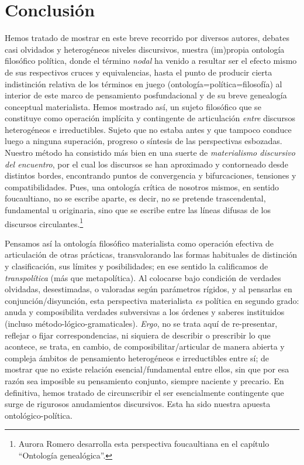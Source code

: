 \section{Conclusión} %

Hemos tratado de mostrar en este breve recorrido por diversos autores, debates casi olvidados y heterogéneos niveles discursivos, nuestra (im)propia ontología filosófico política, donde el término \emph{nodal} ha venido a resultar ser el efecto mismo de sus respectivos cruces y equivalencias, hasta el punto de producir cierta indistinción relativa de los términos en juego (ontología=política=filosofía) al interior de este marco de pensamiento posfundacional y de su breve genealogía conceptual materialista. Hemos mostrado así, un sujeto filosófico que se constituye como operación implícita y contingente de articulación \emph{entre} discursos heterogéneos e irreductibles. Sujeto que no estaba antes y que tampoco conduce luego a ninguna superación, progreso o síntesis de las perspectivas esbozadas. Nuestro método ha consistido más bien en una suerte de \emph{materialismo discursivo del encuentro}, por el cual los discursos se han aproximado y contorneado desde distintos bordes, encontrando puntos de convergencia y bifurcaciones, tensiones y compatibilidades. Pues, una ontología crítica de nosotros mismos, en sentido foucaultiano, no se escribe aparte, es decir, no se pretende trascendental, fundamental u originaria, sino que se escribe entre las líneas difusas de los discursos circulantes.\footnote{Aurora Romero desarrolla esta perspectiva foucaultiana en el capítulo \enquote{Ontología genealógica}.}

Pensamos así la ontología filosófico materialista como operación efectiva de articulación de otras prácticas, transvalorando las formas habituales de distinción y clasificación, sus límites y posibilidades; en ese sentido la calificamos de \emph{transpolítica} (más que metapolítica). Al colocarse bajo condición de verdades olvidadas, desestimadas, o valoradas según parámetros rígidos, y al pensarlas en conjunción/disyunción, esta perspectiva materialista \emph{es} política en segundo grado: anuda y composibilita verdades subversivas a los órdenes y saberes instituidos (incluso método-lógico-gramaticales). \emph{Ergo}, no se trata aquí de re-presentar, reflejar o fijar correspondencias, ni siquiera de describir o prescribir lo que acontece, se trata, en cambio, de composibilitar/articular de manera abierta y compleja ámbitos de pensamiento heterogéneos e irreductibles entre sí; de mostrar que no existe relación esencial/fundamental entre ellos, sin que por esa razón sea imposible su pensamiento conjunto, siempre naciente y precario. En definitiva, hemos tratado de circunscribir el ser esencialmente contingente que surge de rigurosos anudamientos discursivos. Esta ha sido  nuestra apuesta ontológico-política.

